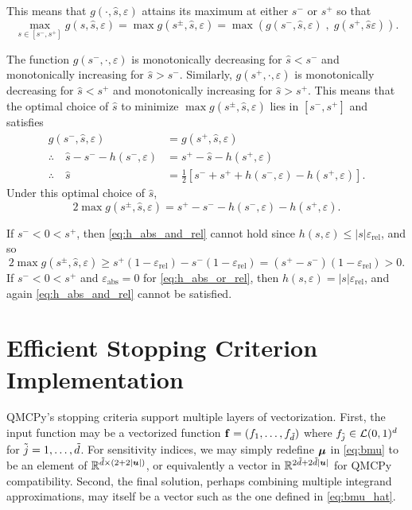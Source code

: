 \documentclass{article}
\newcommand{\varepsabs}{\varepsilon_\text{abs}}
\newcommand{\varepsrel}{\varepsilon_\text{rel}}
\begin{document}
This means that $g(\cdot,\hat{s},\varepsilon)$ attains its maximum at either $s^-$ or $s^+$ so that
\begin{equation}
    \max_{s \in [s^-,s^+]} g(s,\hat{s},\varepsilon) = \max g(s^\pm,\hat{s},\varepsilon) = \max\left(g(s^-,\hat{s},\varepsilon) \;,\; g(s^+,\hat{s}\varepsilon)\right).
\end{equation}

The function $g(s^-,\cdot,\varepsilon)$ is monotonically decreasing for $\hat{s} < s^-$ and monotonically increasing for $\hat{s} > s^-$. Similarly, $g(s^+,\cdot,\varepsilon)$ is monotonically decreasing for $\hat{s} < s^+$ and monotonically increasing for $\hat{s} > s^+$. This means that the optimal choice of $\hat{s}$ to minimize $\max g(s^\pm,\hat{s},\varepsilon)$ lies in $[s^-,s^+]$ and satisfies 
\begin{align}
    g(s^-,\hat{s},\varepsilon) &= g(s^+,\hat{s},\varepsilon) \\
    \therefore \quad \hat{s} - s^- - h(s^-,\varepsilon) &= s^+ - \hat{s} - h(s^+,\varepsilon) \\ 
    \therefore \quad \hat{s} &= \frac{1}{2}\left[ s^- + s^+ +h(s^-,\varepsilon) - h(s^+,\varepsilon) \right]. \label{eq:shat_opt}
\end{align}
Under this optimal choice of $\hat{s}$, 
\begin{equation}
    \label{eq:g_under_shat_opt}
    2 \max g(s^\pm,\hat{s},\varepsilon) =  s^+  -  s^-  - h(s^-,\varepsilon) - h(s^+,\varepsilon).
\end{equation}

If $s^- < 0 < s^+$, then \eqref{eq:h_abs_and_rel} cannot hold since $h(s,\varepsilon) \le \lvert s \rvert \varepsrel$, and so
\begin{equation}
2 \max g(s^\pm,\hat{s},\varepsilon) \ge s^+ (1 - \varepsrel) - s^- (1  - \varepsrel) = (s^+ - s^-)(1 - \varepsrel) > 0.
\end{equation}
If $s^- < 0 < s^+$ and $\varepsabs = 0$ for \eqref{eq:h_abs_or_rel}, then $h(s,\varepsilon) = \lvert s \rvert \varepsrel$, and again \eqref{eq:h_abs_and_rel} cannot be satisfied.

\section{Efficient Stopping Criterion Implementation}
\label{sec: Efficient Stopping Criterion Implementation}

QMCPy's stopping criteria support multiple layers of vectorization. First, the input function may be a vectorized function $\mathbf{f} = (f_1,\dots,f_{\tilde{d}} )$ where $f_{\tilde{j}} \in \mathcal{L}(0,1)^d$ for $\tilde{j}=1,\dots,\tilde{d}$. For sensitivity indices, we may simply redefine $\boldsymbol{\mu}$ in \eqref{eq:bmu} to be an element of $\mathbb{R}^{\tilde{d} \times (2+2\lvert \boldsymbol{u} \rvert)}$, or equivalently a vector in $\mathbb{R}^{2\tilde{d}+2\tilde{d}\lvert \boldsymbol{u} \rvert}$ for QMCPy compatibility. Second, the final solution, perhaps combining multiple integrand approximations, may itself be a vector such as the one defined in  \eqref{eq:bmu_hat}.
\end{document}
